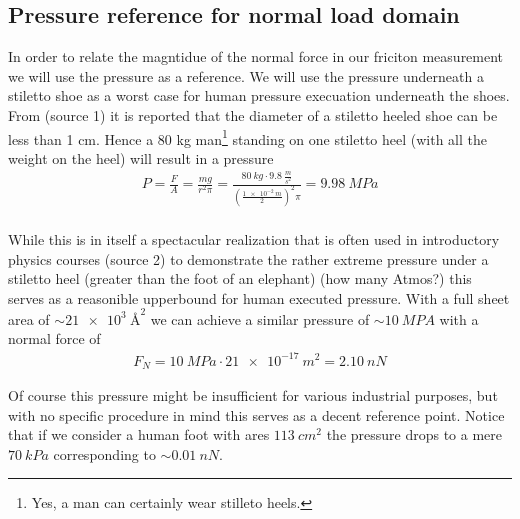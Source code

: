 \subsection{Pressure reference for normal load domain}


In order to relate the magntidue of the normal force in our friciton measurement
we will use the pressure as a reference. We will use the pressure underneath a
stiletto shoe as a worst case for human pressure execuation underneath the
shoes. From (source 1) it is reported that the diameter of a stiletto heeled
shoe can be less than 1 cm. Hence a 80 kg man\footnote{Yes, a man can certainly
wear stilleto heels.} standing on one stiletto heel (with all the weight on the
heel) will result in a pressure
\begin{align*}
  P = \frac{F}{A} = \frac{mg}{r^2\pi} = \frac{\SI{80}{kg} \cdot \SI{9.8}{\frac{m}{s^2}}}{(\frac{\SI{1e-2}{m}}{2})^2 \pi} = \SI{9.98}{MPa} \\
\end{align*} 

While this is in itself a spectacular realization that is often used in
introductory physics courses (source 2) to demonstrate the rather extreme
pressure under a stiletto heel (greater than the foot of an elephant) (how many
Atmos?) this serves as a reasonible upperbound for human executed pressure. With
a full sheet area of $\sim\SI{21e3}{{\text{Å}}^2}$ we can achieve a similar pressure of
$\sim \SI{10}{MPA}$ with a normal force of
\begin{align*}
  F_N = \SI{10}{MPa} \cdot \SI{21e-17}{m^2} = \SI{2.10}{nN}  
\end{align*}

Of course this pressure might be insufficient for various industrial purposes,
but with no specific procedure in mind this serves as a decent reference point.
Notice that if we consider a human foot with ares $\SI{113}{cm^2}$ the pressure
drops to a mere $\SI{70}{kPa}$ corresponding to $\sim \SI{0.01}{nN}$.




